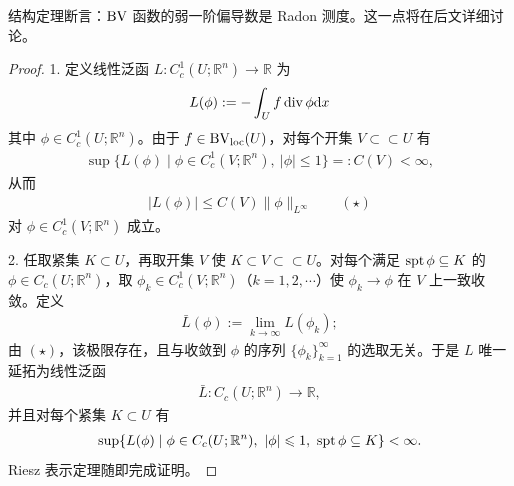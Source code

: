 \documentclass[../../main.tex]{subfiles}%
\begin{document}
\begin{remark}\label{remark:ch05-thm-5-1-结构}
结构定理断言：$\mathrm{BV}$ 函数的弱一阶偏导数是 Radon 测度。这一点将在后文详细讨论。
\end{remark}

\begin{proof}
1. 定义线性泛函 $L:C_c^1(U;\mathbb{R}^n)\to\mathbb{R}$ 为
\begin{align*}
L(\phi):=-\int_U f\operatorname{div}\phi\mathrm{d} x
\end{align*}
其中 $\phi\in C_c^1(U;\mathbb{R}^n)$。由于 $f\in\mathrm{BV}_{\mathrm{loc}}(U)$，对每个开集 $V\subset\subset U$ 有
\begin{align*}
\sup\{L(\phi)\mid\phi\in C_c^1(V;\mathbb{R}^n),\ \lvert\phi\rvert\leqslant1\}=:C(V)<\infty,
\end{align*}
从而
\begin{align*}
\lvert L(\phi)\rvert\leqslant C(V)\lVert\phi\rVert_{L^{\infty}}\qquad(\star)
\end{align*}
对 $\phi\in C_c^1(V;\mathbb{R}^n)$ 成立。

2. 任取紧集 $K\subset U$，再取开集 $V$ 使 $K\subset V\subset\subset U$。对每个满足 $\operatorname{spt}\phi\subseteq K$ 的 $\phi\in C_c(U;\mathbb{R}^n)$，取 $\phi_k\in C_c^1(V;\mathbb{R}^n)$（$k=1,2,\cdots$）使 $\phi_k\to\phi$ 在 $V$ 上一致收敛。定义
\begin{align*}
\bar L(\phi):=\lim_{k\to\infty}L(\phi_k);
\end{align*}
由 $(\star)$，该极限存在，且与收敛到 $\phi$ 的序列 $\{\phi_k\}_{k=1}^{\infty}$ 的选取无关。于是 $L$ 唯一延拓为线性泛函
\begin{align*}
\bar L:C_c(U;\mathbb{R}^n)\to\mathbb{R},
\end{align*}
并且对每个紧集 $K\subset U$ 有
\begin{align*}
\sup\{L(\phi)\mid\phi\in C_c(U;\mathbb{R}^n),\ \lvert\phi\rvert\leqslant1,\ \spt\phi\subseteq K\}<\infty .
\end{align*}
Riesz 表示定理随即完成证明。
\end{proof}
\end{document}

